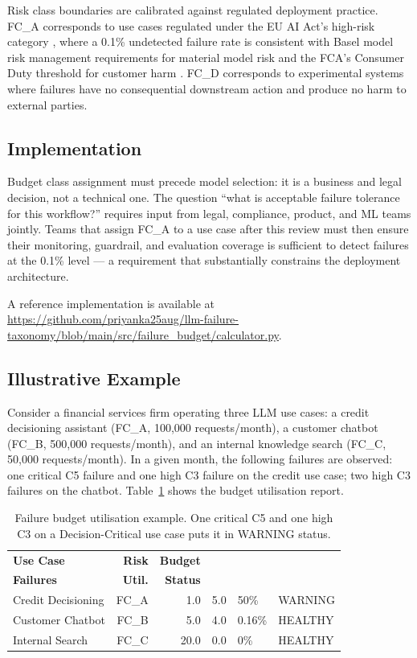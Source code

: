 \documentclass{article}
\begin{document}
Risk class boundaries are calibrated against regulated deployment practice.
FC\_A corresponds to use cases regulated under the EU AI Act's high-risk
category \citep{euaiact2024}, where a 0.1\% undetected failure rate is
consistent with Basel model risk management requirements for material model
risk \citep{dora2022} and the FCA's Consumer Duty threshold for customer harm
\citep{fcaconsumerduty2024}.  FC\_D corresponds to experimental systems where
failures have no consequential downstream action and produce no harm to
external parties.

\subsection{Implementation}

Budget class assignment must precede model selection: it is a business and
legal decision, not a technical one.  The question ``what is acceptable failure
tolerance for this workflow?'' requires input from legal, compliance, product,
and ML teams jointly.  Teams that assign FC\_A to a use case after this review
must then ensure their monitoring, guardrail, and evaluation coverage is
sufficient to detect failures at the 0.1\% level --- a requirement that
substantially constrains the deployment architecture.

A reference implementation is available at
\url{https://github.com/priyanka25aug/llm-failure-taxonomy/blob/main/src/failure_budget/calculator.py}.

\subsection{Illustrative Example}

Consider a financial services firm operating three LLM use cases: a credit
decisioning assistant (FC\_A, 100{,}000 requests/month), a customer chatbot
(FC\_B, 500{,}000 requests/month), and an internal knowledge search (FC\_C,
50{,}000 requests/month).  In a given month, the following failures are
observed: one critical C5 failure and one high C3 failure on the credit use
case; two high C3 failures on the chatbot.  Table~\ref{tab:budget_example}
shows the budget utilisation report.

\begin{table}[h]
\caption{Failure budget utilisation example.  One critical C5 and one high C3
on a Decision-Critical use case puts it in WARNING status.}
\label{tab:budget_example}
\centering
\small
\begin{tabular}{lrrrll}
\toprule
\textbf{Use Case} & \textbf{Risk} & \textbf{Budget} &
\makecell{\textbf{Weighted}\\\textbf{Failures}} & \textbf{Util.} & \textbf{Status} \\
\midrule
Credit Decisioning & FC\_A & 1.0 & 5.0 & 50\%  & WARNING \\
Customer Chatbot   & FC\_B & 5.0 & 4.0 & 0.16\% & HEALTHY \\
Internal Search    & FC\_C & 20.0 & 0.0 & 0\%   & HEALTHY \\
\bottomrule
\end{tabular}
\end{table}
\end{document}
